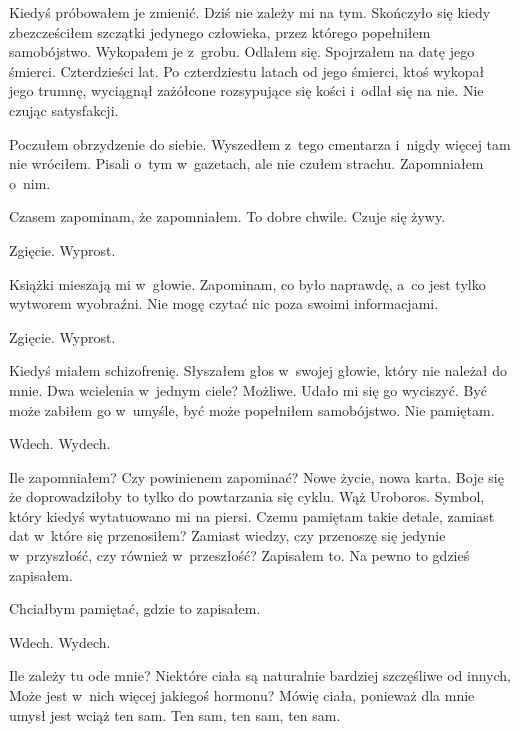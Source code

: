 Kiedyś próbowałem je zmienić. Dziś nie zależy mi na tym. Skończyło się kiedy zbezcześciłem szczątki jedynego człowieka, przez którego popełniłem samobójstwo. Wykopałem je z~grobu. Odlałem się. Spojrzałem na datę jego śmierci.
Czterdzieści lat. Po czterdziestu latach od jego śmierci, ktoś wykopał jego trumnę, wyciągnął zażółcone rozsypujące się kości i~odlał się na nie. Nie czując satysfakcji.

Poczułem obrzydzenie do siebie. Wyszedłem z~tego cmentarza i~nigdy więcej tam nie wróciłem. Pisali o~tym w~gazetach, ale nie czułem strachu. Zapomniałem o~nim.

Czasem zapominam, że zapomniałem. To dobre chwile. Czuje się żywy.

\begin{itquote}
Zgięcie. Wyprost.
\end{itquote}

Książki mieszają mi w~głowie. Zapominam, co było naprawdę, a~co jest tylko wytworem wyobraźni. Nie mogę czytać nic poza swoimi informacjami. 

\begin{itquote}
Zgięcie. Wyprost.
\end{itquote}

Kiedyś miałem schizofrenię. Słyszałem głos w~swojej głowie, który nie należał do mnie. Dwa wcielenia w~jednym ciele? Możliwe. Udało mi się go wyciszyć. Być może zabiłem go w~umyśle, być może popełniłem samobójstwo. Nie pamiętam. 

\begin{itquote}
Wdech. Wydech.
\end{itquote}

Ile zapomniałem? Czy powinienem zapominać? Nowe życie, nowa karta. Boje się że doprowadziłoby to tylko do powtarzania się cyklu. Wąż Uroboros. Symbol, który kiedyś wytatuowano mi na piersi. Czemu pamiętam takie detale, zamiast dat w~które się przenosiłem? Zamiast wiedzy, czy przenoszę się jedynie w~przyszłość, czy również w~przeszłość? Zapisałem to. Na pewno to gdzieś zapisałem.

Chciałbym pamiętać, gdzie to zapisałem.

\begin{itquote}
Wdech. Wydech.
\end{itquote}

Ile zależy tu ode mnie? Niektóre ciała są naturalnie bardziej szczęśliwe od innych, Może jest w~nich więcej jakiegoś hormonu? Mówię ciała, ponieważ dla mnie umysł jest wciąż ten sam. Ten sam, ten sam, ten sam.

